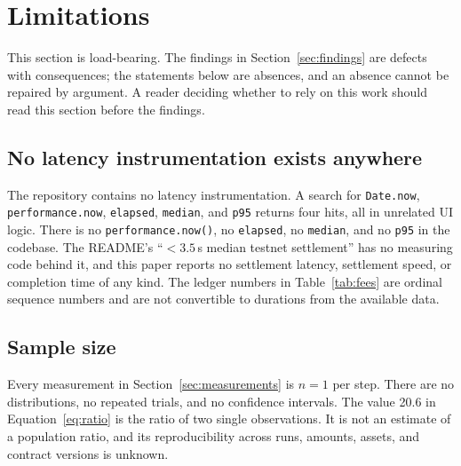 \documentclass[sigconf,review]{acmart}
\begin{document}

\section{Limitations}
\label{sec:limitations}

This section is load-bearing. The findings in Section~\ref{sec:findings} are
defects with consequences; the statements below are absences, and an absence
cannot be repaired by argument. A reader deciding whether to rely on this work
should read this section before the findings.

\subsection{No latency instrumentation exists anywhere}
The repository contains no latency instrumentation. A search for
\texttt{Date.now}, \texttt{performance.now}, \texttt{elapsed},
\texttt{median}, and \texttt{p95} returns four hits, all in unrelated UI logic.
There is no \texttt{performance.now()}, no \texttt{elapsed}, no
\texttt{median}, and no \texttt{p95} in the codebase. The README's
``$<3.5$\,s median testnet settlement'' has no measuring code behind it, and
this paper reports no settlement latency, settlement speed, or completion time
of any kind. The ledger numbers in Table~\ref{tab:fees} are ordinal sequence
numbers and are not convertible to durations from the available data.

\subsection{Sample size}
Every measurement in Section~\ref{sec:measurements} is $n=1$ per step. There
are no distributions, no repeated trials, and no confidence intervals. The
value 20.6 in Equation~\ref{eq:ratio} is the ratio of two single observations.
It is not an estimate of a population ratio, and its reproducibility across
runs, amounts, assets, and contract versions is unknown.
\end{document}
